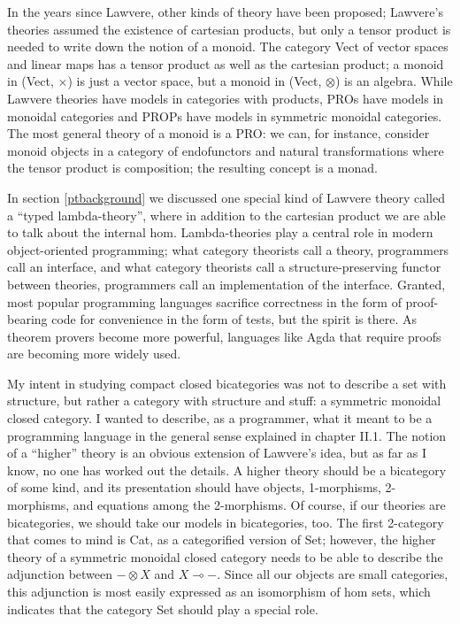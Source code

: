 \documentclass[12pt,twoside,openright]{report}
\newcommand{\lhom}{\multimap}
\begin{document}
In the years since Lawvere, other kinds of theory have been proposed; Lawvere's theories assumed the existence of cartesian products, but only a tensor product is needed to write down the notion of a monoid.  The category Vect of vector spaces and linear maps has a tensor product as well as the cartesian product; a monoid in (Vect, $\times$) is just a vector space, but a monoid in (Vect, $\otimes$) is an algebra.  While Lawvere theories have models in categories with products, PROs have models in monoidal categories and PROPs have models in symmetric monoidal categories.  The most general theory of a monoid is a PRO: we can, for instance, consider monoid objects in a category of endofunctors and natural transformations where the tensor product is composition; the resulting concept is a monad.

In section \ref{ptbackground} we discussed one special kind of Lawvere theory called a ``typed lambda-theory'', where in addition to the cartesian product we are able to talk about the internal hom.  Lambda-theories play a central role in modern object-oriented programming; what category theorists call a theory, programmers call an interface, and what category theorists call a structure-preserving functor between theories, programmers call an implementation of the interface.  Granted, most popular programming languages sacrifice correctness in the form of proof-bearing code for convenience in the form of tests, but the spirit is there.  As theorem provers become more powerful, languages like Agda that require proofs are becoming more widely used.

My intent in studying compact closed bicategories was not to describe a set with structure, but rather a category with structure and stuff: a symmetric monoidal closed category.  I wanted to describe, as a programmer, what it meant to be a programming language in the general sense explained in chapter II.1.  The notion of a ``higher'' theory is an obvious extension of Lawvere's idea, but as far as I know, no one has worked out the details.  A higher theory should be a bicategory of some kind, and its presentation should have objects, 1-morphisms, 2-morphisms, and equations among the 2-morphisms.  Of course, if our theories are bicategories, we should take our models in bicategories, too.  The first 2-category that comes to mind is Cat, as a categorified version of Set; however, the higher theory of a symmetric monoidal closed category needs to be able to describe the adjunction between $- \otimes X$ and $X \lhom -$.  Since all our objects are small categories, this adjunction is most easily expressed as an isomorphism of hom sets, which indicates that the category Set should play a special role.
\end{document}
